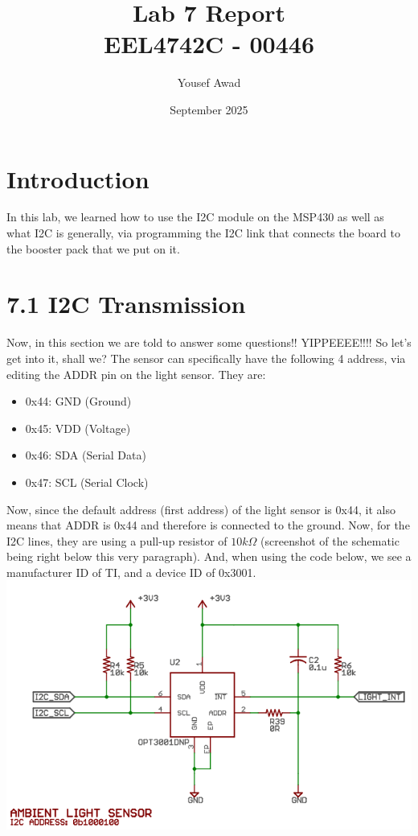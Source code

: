 \documentclass{article}
\title{Lab 7 Report \\ \large EEL4742C - 00446}
\author{Yousef Awad}
\date{September 2025}
\begin{document}
\maketitle
\tableofcontents
\newpage

\section{Introduction}
In this lab, we learned how to use the I2C module on the MSP430 as well as what I2C is generally, via programming the I2C link that connects the board to the booster pack that we put on it.

\section{7.1 I2C Transmission}
Now, in this section we are told to answer some questions!! YIPPEEEE!!!! So let's get into it, shall we? The sensor can specifically have the following 4 address, via editing the ADDR pin on the light sensor. They are:
\begin{itemize}
  \item 0x44: GND (Ground)
  \item 0x45: VDD (Voltage)
  \item 0x46: SDA (Serial Data)
  \item 0x47: SCL (Serial Clock)
\end{itemize}
Now, since the default address (first address) of the light sensor is 0x44, it also means that ADDR is 0x44 and therefore is connected to the ground. Now, for the I2C lines, they are using a pull-up resistor of $10k\Omega$ (screenshot of the schematic being right below this very paragraph). And, when using the code below, we see a manufacturer ID of TI, and a device ID of 0x3001. 
\includegraphics[width=1\textwidth]{pictures/image.png}
\pagebreak

\pagebreak
\end{document}

